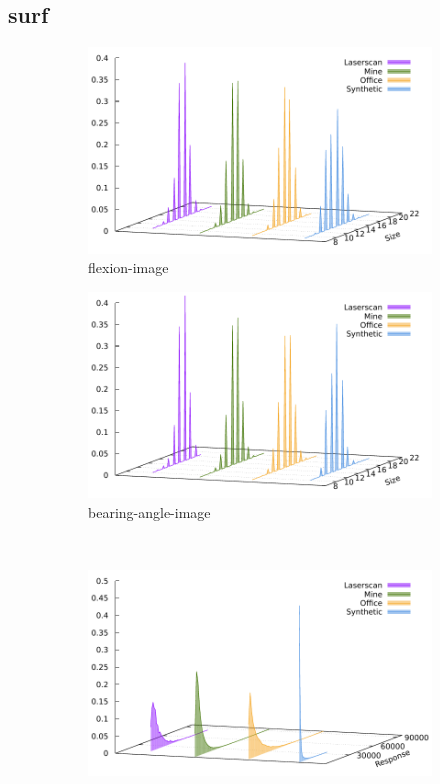 \subsection{\acrshort{surf}}\label{sec:surf_stats}
\begin{figure}[H]
\begin{subfigure}[t]{0.45\linewidth}
    \includegraphics[width=\linewidth]{chapter06/results/SURF/flexion/size.pdf}%
    \caption{\gls{flexion-image}}
\end{subfigure}\quad
\begin{subfigure}[t]{0.45\linewidth}
    \includegraphics[width=\linewidth]{chapter06/results/SURF/bearing/size.pdf}
    \caption{\gls{bearing-angle-image}}
\end{subfigure}\\
\begin{subfigure}[t]{0.45\linewidth}
    \includegraphics[width=\linewidth]{chapter06/results/SURF/flexion/response.pdf}%

\end{subfigure}
\end{figure}
